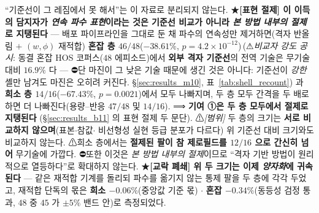 \documentclass[11pt]{report}
\numberwithin{equation}{chapter}
\numberwithin{figure}{chapter}
\numberwithin{table}{chapter}
\newcommand{\CmpSkill}{\,(⚠\emph{비교자 강도 공시}: 동결 혼잡 HOS 코퍼스($48$ 에피소드)에서
\textbf{외부 격자 기준선}의 전역 기술은 무기술 대비 $16.9\%$ 다 --- ⛔단 마진이 그 낮은
기술 때문에 생긴 것은 아니다: 기준선이 \emph{강한} 셸만 남겨도 마진은 오히려 커진다.
\S\ref{sec:results_m10}, 표~\ref{tab:shell_recount})}
\begin{document}
\begin{enumerate}
        ``기준선이 그 레짐에서 못 해서''는 이 자료로 분리되지 않는다.
        ★\textbf{[표현 절제] 이 이득의 담지자가 \emph{연속 파수 표현}이라는 것은
        기준선 비교가 아니라 \emph{본 방법 내부의 절제}로 지탱된다} --- 배포
        파이프라인을 그대로 둔 채 파수의 연속성만 제거하면(격자 반올림 $+$ $(w,\phi)$
        재적합) \textbf{혼잡 층 $46/48$}($-38.61\%$, $p = 4.2\times10^{-12}$)\CmpSkill{} 과
        \textbf{희소 층 $14/16$}($-67.43\%$, $p = 0.0021$)에서 모두 나빠지며,
        두 층 모두 간격을 두 배로 하면 더 나빠진다(용량--반응 $47/48$ 및 $14/16$).
        ⟹ \textbf{기여 ①은 두 층 모두에서 절제로 지탱된다}
        (\S\ref{sec:results_b11} 의 표현 절제 두 문단).
        ⚠\emph{[범위]} 두 층의 크기는 \textbf{서로 비교하지 않으며}(표본$\cdot$참값$\cdot$
        비선형성 실현 등급 분포가 다르다) 위 기준선 대비 크기와도 비교하지 않는다.
        ⚠희소 층에서는 \textbf{절제된 팔이 참 제로필드를 $12/16$ 으로 간신히 넘어}
        무기술에 가깝다. ⛔또한 이것은 \emph{본 방법 내부의 절제}이므로
        ``격자 기반 방법이 원리적으로 열등하다''로 확대하지 않는다.
        ★\textbf{[교락 폐쇄] 위 두 크기는 이제 \emph{양자화}에 귀속된다} --- 같은
        재적합 기계를 돌리되 파수를 옮기지 않는 통제 팔을 두 층에 각각 두었고, 재적합
        단독의 몫은 \textbf{희소 $-0.06\%$}(중앙값 기준 몫) $\cdot$ \textbf{혼잡
        $-0.34\%$}(동등성 검정 통과, $48$ 중 $45$ 가 $\pm 5\%$ 밴드 안)로 측정되었다.

\end{enumerate}
\end{document}
